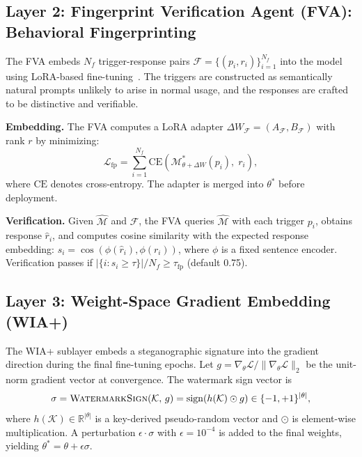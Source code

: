 \documentclass[journal,compsoc]{IEEEtran}
\newcommand{\M}{\mathcal{M}}
\newcommand{\K}{\mathcal{K}}
\newcommand{\F}{\mathcal{F}}
\begin{document}
\subsection{Layer 2: Fingerprint Verification Agent (FVA): Behavioral Fingerprinting}

The FVA embeds $N_f$ trigger-response pairs $\F = \{(p_i, r_i)\}_{i=1}^{N_f}$
into the model using LoRA-based fine-tuning~\cite{hu2022lora}. The triggers
are constructed as semantically natural prompts unlikely to arise in normal
usage, and the responses are crafted to be distinctive and verifiable.

\textbf{Embedding.} The FVA computes a LoRA adapter
$\Delta W_\F = (A_\F, B_\F)$ with rank $r$ by minimizing:
\begin{equation}
  \mathcal{L}_{\text{fp}} = \sum_{i=1}^{N_f} \mathrm{CE}
    \left( \M^*_{\theta+\Delta W}(p_i),\; r_i \right),
  \label{eq:fp_loss}
\end{equation}
where $\mathrm{CE}$ denotes cross-entropy. The adapter is merged into
$\theta^*$ before deployment.

\textbf{Verification.} Given $\hat{\M}$ and $\F$, the FVA queries $\hat{\M}$
with each trigger $p_i$, obtains response $\hat{r}_i$, and computes cosine
similarity with the expected response embedding:
$s_i = \cos(\phi(\hat{r}_i), \phi(r_i))$, where $\phi$ is a fixed sentence
encoder. Verification passes if
$|\{i : s_i \geq \tau\}| / N_f \geq \tau_{\text{fp}}$ (default 0.75).

\subsection{Layer 3: Weight-Space Gradient Embedding (WIA+)}

The WIA+ sublayer embeds a steganographic signature into the gradient
direction during the final fine-tuning epochs. Let
$g = \nabla_\theta \mathcal{L} / \|\nabla_\theta \mathcal{L}\|_2$ be the
unit-norm gradient vector at convergence. The watermark sign vector is
\begin{equation}
  \sigma = \textsc{WatermarkSign}(\K,\, g)
         = \mathrm{sign}\!\left(h(\K) \odot g\right) \in \{-1,+1\}^{|\theta|},
  \label{eq:wiaplus}
\end{equation}
where $h(\K) \in \mathbb{R}^{|\theta|}$ is a key-derived pseudo-random
vector and $\odot$ is element-wise multiplication. A perturbation
$\epsilon \cdot \sigma$ with $\epsilon = 10^{-4}$ is added to the final
weights, yielding $\theta^* = \theta + \epsilon\sigma$.
\end{document}
